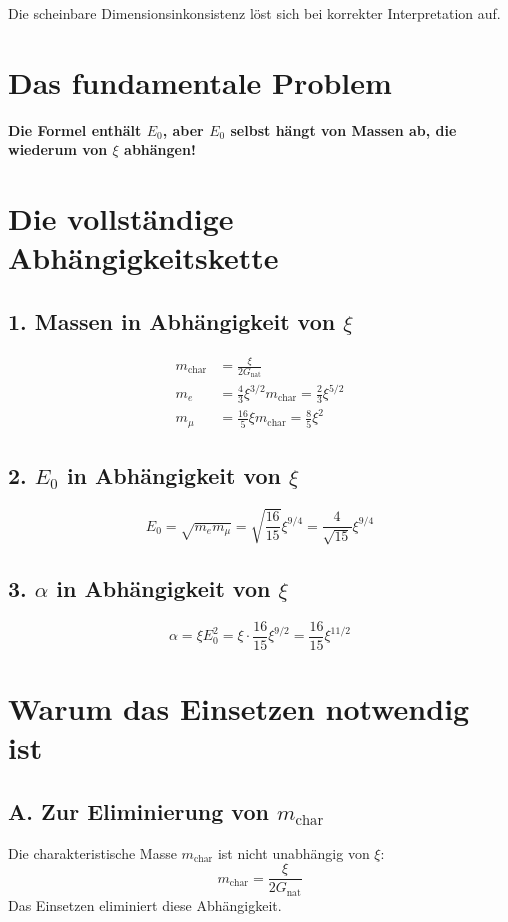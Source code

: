 \documentclass[12pt, a4paper]{article}
\begin{document}
Die scheinbare Dimensionsinkonsistenz löst sich bei korrekter Interpretation auf.	

	
\section*{Das fundamentale Problem}

\textbf{Die Formel enthält $E_0$, aber $E_0$ selbst hängt von Massen ab, die wiederum von $\xi$ abhängen!}

\section*{Die vollständige Abhängigkeitskette}

\subsection*{1. Massen in Abhängigkeit von $\xi$}
\begin{align*}
	m_{\text{char}} &= \frac{\xi}{2G_{\text{nat}}} \\
	m_e &= \frac{4}{3} \xi^{3/2} m_{\text{char}} = \frac{2}{3} \xi^{5/2} \\
	m_\mu &= \frac{16}{5} \xi m_{\text{char}} = \frac{8}{5} \xi^2
\end{align*}

\subsection*{2. $E_0$ in Abhängigkeit von $\xi$}
\[
E_0 = \sqrt{m_e m_\mu} = \sqrt{\frac{16}{15}} \xi^{9/4} = \frac{4}{\sqrt{15}} \xi^{9/4}
\]

\subsection*{3. $\alpha$ in Abhängigkeit von $\xi$}
\[
\alpha = \xi E_0^2 = \xi \cdot \frac{16}{15} \xi^{9/2} = \frac{16}{15} \xi^{11/2}
\]

\section*{Warum das Einsetzen notwendig ist}

\subsection*{A. Zur Eliminierung von $m_{\text{char}}$}
Die charakteristische Masse $m_{\text{char}}$ ist nicht unabhängig von $\xi$:
\[
m_{\text{char}} = \frac{\xi}{2G_{\text{nat}}}
\]
Das Einsetzen eliminiert diese Abhängigkeit.
\end{document}
